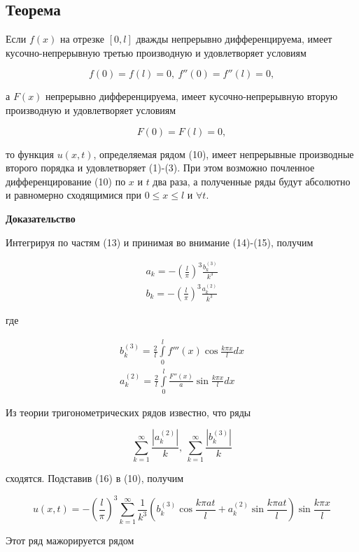 \subsection{Теорема}

Если $f(x)$ на отрезке $[0, l]$ дважды непрерывно дифференцируема, имеет кусочно-непрерывную третью производную и удовлетворяет условиям

\[
	f(0) = f(l) = 0, ~ f''(0) = f''(l) = 0, \tag{14}
\]

а $F(x)$ непрерывно дифференцируема, имеет кусочно-непрерывную вторую производную и удовлетворяет условиям

\[
	F(0) = F(l) = 0, \tag{15}
\]

то функция $u(x, t)$, определяемая рядом (10), имеет непрерывные производные второго порядка и удовлетворяет (1)-(3). При этом возможно почленное дифференцирование (10) по $x$ и $t$ два раза, а полученные ряды будут абсолютно и равномерно сходящимися при $0 \le x \le l$ и $\forall t$.

\textbf{Доказательство}

Интегрируя по частям (13) и принимая во внимание (14)-(15), получим

\[
	\begin{aligned}
		a_k = - \left( \frac{l}{\pi} \right)^3 \frac{b_k^{(3)}}{k^3} \\
		b_k = - \left( \frac{l}{\pi} \right)^3 \frac{a_k^{(2)}}{k^3}
	\end{aligned}
	\tag{16}
\]

где

\[
	\begin{aligned}
		b_k^{(3)} = \frac{2}{l} \int\limits_0^l f'''(x) \cos \frac{k \pi x}{l} dx \\
		a_k^{(2)} = \frac{2}{l} \int\limits_0^l \frac{F''(x)}{a} \sin \frac{k \pi x}{l} dx
	\end{aligned}
	\tag{17}
\]

Из теории тригонометрических рядов известно, что ряды

\[
	\sum_{k=1}^\infty \frac{\left| a_k^{(2)} \right|}{k}, ~ \sum_{k=1}^\infty \frac{\left| b_k^{(3)} \right|}{k} \tag{18}
\]

сходятся. Подставив (16) в (10), получим

\[
	u(x, t) = - \left( \frac{l}{\pi} \right)^3 \sum_{k=1}^\infty \frac{1}{k^3} \left( b_k^{(3)} \cos \frac{k \pi at}{l} + a_k^{(2)} \sin \frac{k \pi at}{l} \right) \sin \frac{k \pi x}{l} \tag{19}
\]

Этот ряд мажорируется рядом

